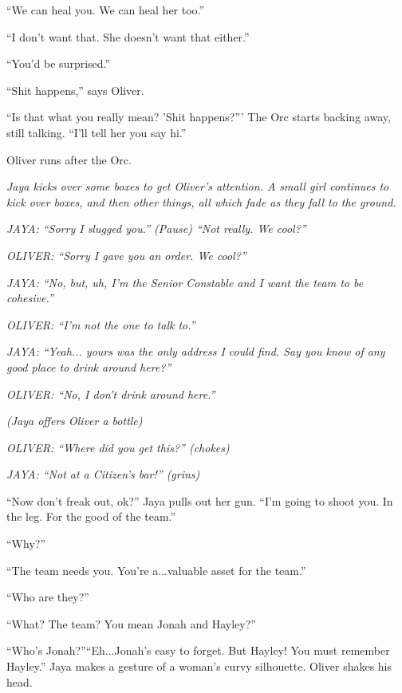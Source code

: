 ``We can heal you.  We can heal her too.''

``I don't want that.  She doesn't want that either.''

``You'd be surprised.''

``Shit happens,'' says Oliver.

``Is that what you really mean?  'Shit happens?'''  The Orc starts backing away, still talking. ``I'll tell her you say hi.''

Oliver runs after the Orc.






\textit{Jaya kicks over some boxes to get Oliver's attention. A small girl continues to kick over boxes, and then other things, all which fade as they fall to the ground.}

\textit{JAYA: ``Sorry I slugged you.'' (Pause) ``Not really.  We cool?''}

\textit{OLIVER: ``Sorry I gave you an order.  We cool?''}

\textit{JAYA: ``No, but, uh, I'm the Senior Constable and I want the team to be cohesive.''}

\textit{OLIVER: ``I'm not the one to talk to.''}

\textit{JAYA: ``Yeah... yours was the only address I could find.  Say you know of any good place to drink around here?''}

\textit{OLIVER: ``No, I don't drink around here.''}

\textit{(Jaya offers Oliver a bottle)}

\textit{OLIVER:  ``Where did you get this?'' (chokes)}

\textit{JAYA: ``Not at a Citizen's bar!'' (grins)}



``Now don't freak out, ok?'' Jaya pulls out her gun.  ``I'm going to shoot you.  In the leg.  For the good of the team.''

``Why?''

``The team needs you.  You're a...valuable asset for the team.''

``Who are they?''

``What?  The team?  You mean Jonah and Hayley?''

``Who's Jonah?''``Eh...Jonah's easy to forget.  But Hayley!  You must remember Hayley.''  Jaya makes a gesture of a woman's curvy silhouette.  Oliver shakes his head.



